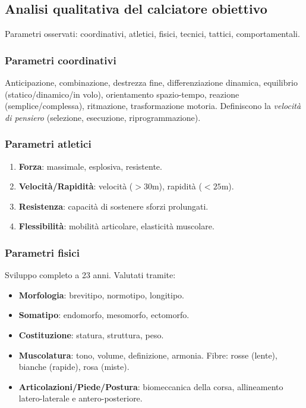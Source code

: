 \documentclass[a4paper,11pt]{article}
\begin{document}
\subsection{Analisi qualitativa del calciatore obiettivo}
Parametri osservati: coordinativi, atletici, fisici, tecnici, tattici, comportamentali.

\subsubsection{Parametri coordinativi}
Anticipazione, combinazione, destrezza fine, differenziazione dinamica, equilibrio (statico/dinamico/in volo), orientamento spazio-tempo, reazione (semplice/complessa), ritmazione, trasformazione motoria. Definiscono la \textit{velocità di pensiero} (selezione, esecuzione, riprogrammazione).

\subsubsection{Parametri atletici}
\begin{enumerate}
    \item \textbf{Forza}: massimale, esplosiva, resistente.
    \item \textbf{Velocità/Rapidità}: velocità ($>30$m), rapidità ($<25$m).
    \item \textbf{Resistenza}: capacità di sostenere sforzi prolungati.
    \item \textbf{Flessibilità}: mobilità articolare, elasticità muscolare.
\end{enumerate}

\subsubsection{Parametri fisici}
Sviluppo completo a 23 anni. Valutati tramite:
\begin{itemize}
    \item \textbf{Morfologia}: brevitipo, normotipo, longitipo.
    \item \textbf{Somatipo}: endomorfo, mesomorfo, ectomorfo.
    \item \textbf{Costituzione}: statura, struttura, peso.
    \item \textbf{Muscolatura}: tono, volume, definizione, armonia. Fibre: rosse (lente), bianche (rapide), rosa (miste).
    \item \textbf{Articolazioni/Piede/Postura}: biomeccanica della corsa, allineamento latero-laterale e antero-posteriore.
\end{itemize}
\end{document}
